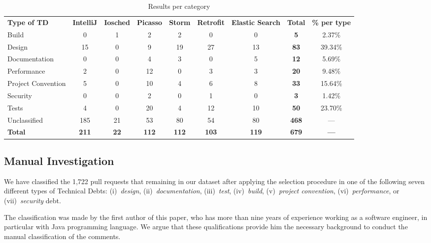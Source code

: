 \documentclass{sig-alternate}
\begin{document}
\begin{table}[ht]
\centering
\caption{Results per category}
  \begin{tabular}{lcccccccc}
    \rowcolor{gray!50}

{\bf Type of TD} &	{\bf IntelliJ} &	{\bf Iosched} &	{\bf Picasso}&	{\bf Storm}&	{\bf Retrofit}&	\multicolumn{1}{p{1.2cm}}{\bf Elastic Search}& 	{\bf Total} &	\multicolumn{1}{p{2cm}}{\bf \% per type}\\[0.166cm]

Build	& 0	&1&	2&	2&	0&	0&	{\bf 5}&	2.37\%\\[0.166cm]
Design&	15&	0&	9&	19&	27&	13&	{\bf83}&	39.34\%\\[0.166cm]
Documentation&	0&	0	&4&	3&	0&	5&	{\bf12}&	5.69\%\\[0.166cm]
Performance&	2&	0&	12&	0&	3&	3&	{\bf20}&	9.48\%\\[0.166cm]
Project Convention&	5&	0&	10&	4&	6&	8&	{\bf33}&	15.64\%\\[0.166cm]
Security&	0&	0&	2&	0	&1	&0&	{\bf3}	&1.42\%\\[0.166cm]
Tests	&4	&0	&20	&4	&12	&10	&{\bf50}	&23.70\%\\[0.166cm]
Unclassified &	185&	21	&53	&80&	54&	80	&{\bf468} & ---	\\[0.166cm]



    \rowcolor{gray!50}
{\bf Total}		& {\bf 211} & {\bf 22} & {\bf 112} &	{\bf 112}	& {\bf 103}	& {\bf 119} 	& {\bf 679} 	& {\bf ---}\\[0.166cm]

  \end{tabular}

  \label{tb:results_per_category}  
\end{table}

\subsection{Manual Investigation}

We have classified the 1,722 pull requests that remaining in our dataset after applying the selection procedure in one of the following seven different types of Technical Debts: {(i)~\em design}, (ii)~{\em documentation}, (iii)~{\em test}, (iv)~{\em build}, (v)~{\em project convention}, (vi)~{\em performance}, or (vii)~{\em security} debt.

The classification was made by the first author of this paper, who has more than nine years of experience working as a software engineer, in particular with Java programming language. 
%
We argue that these qualifications provide him the necessary background to conduct the manual classification of the comments. 
%
\end{document}
